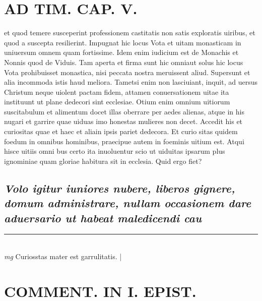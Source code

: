 \documentclass{article}
\begin{document}
\begin{pages}
\section*{AD TIM. CAP. V. }
\marginpar{[ p.154 ]}\pstart et quod temere susceperint professionem castitatis non satis exploratis uiribus, et quod a suscepta resilierint. Impugnat hic locus Vota et uitam monasticam in uniuersum omnem quam fortissime. Idem enim iudicium est de Monachis et Nonnis quod de Viduis. Tam aperta et firma sunt hic omniaut solus hic locus Vota prohibuisset monastica, nisi peccata nostra meruissent aliud. Supersunt et alia incommoda istis haud meliora. Tametsi enim non lasciuiant, inquit, ad uersus Christum neque uiolent pactam fidem, attamen conuersationem uitae ita instituunt ut plane dedecori sint ecclesiae. Otium enim omnium uitiorum suscitabulum et alimentum docet illas oberrare per aedes alienas, atque in his nugari et garrire quae uiduas imo honestas mulieres non decet. Accedit his et curiositas quae et haec et aliain ipsis pariet dedecora. Et curio sitas quidem foedum in omnibus hominibus, praecipue autem in foeminis uitium est. Atqui hisce uitiis omni bus certo ita inuoluentur scio ut uiduitas ipsarum plus ignominiae quam gloriae habitura sit in ecclesia. Quid ergo fiet?  \pend
{}
{}
\subsection*{\textit{Volo igitur iuniores nubere, liberos gignere, domum administrare, nullam occasionem dare aduersario ut habeat maledicendi cau}}
\vspace{0.5cm}\noindent
\vspace{0.2cm}\rule{1cm}{0.2pt}\\ 
\hspace{0.2cm}\textit{mg}
\footnotesize Curiosstas mater est garrulitatis. 
\normalsize| 
\section*{COMMENT. IN I. EPIST. }
{}

\end{pages}
\end{document}
